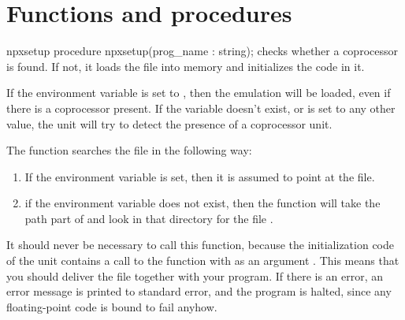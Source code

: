 \section{Functions and procedures}
\begin{function}{npxsetup}
\Declaration
procedure npxsetup(prog\_name : string);
\Description
{} checks whether a coprocessor is found. If not, it loads the 
file  into memory and initializes the code in it.

If the environment variable  is set to , then the emulation
will be loaded, even if there is a coprocessor present. If the variable
doesn't exist, or is set to any other value, the unit will try to detect 
the presence of a coprocessor unit.

The function searches the file  in the following way:
\begin{enumerate}
\item If the environment variable  is set, then it is assumed
to point at the  file.
\item if the environment variable  does not exist, then the 
function will take the path part of   and look in that
directory for the file .
\end{enumerate}

It should never be necessary to call this function, because the
initialization code of the unit contains a call to the function with
as an argument . This means that you should deliver the
file  together with your program.
\Errors
If there is an error, an error message is printed to standard error, and
the program is halted, since any floating-point code is bound to fail anyhow.
\end{function}
